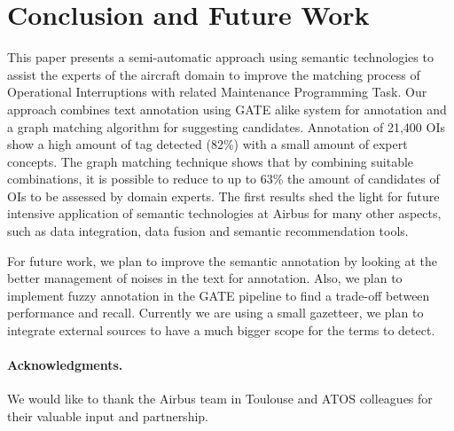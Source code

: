 \documentclass[runningheads,a4paper]{{llncs}}
\begin{document}
\section{Conclusion and Future Work}
\label{sec:conclusion}
This paper presents a semi-automatic approach using semantic technologies to assist the experts of the aircraft domain to improve the matching process of Operational Interruptions with related Maintenance Programming Task. Our approach combines text annotation using GATE alike system for annotation and a graph matching algorithm for suggesting candidates. Annotation of 21,400 OIs show a high amount of tag detected (82\%) with a small amount of expert concepts. The graph matching technique shows that by combining suitable combinations, it is possible to reduce to up to 63\% the amount of candidates of OIs to be assessed by domain experts. The first results shed the light for future intensive application of semantic technologies at Airbus for many other aspects, such as data integration, data fusion and semantic recommendation tools. 

For future work, we plan to improve the semantic annotation by looking at the better management of noises in the text for annotation. Also, we plan to implement fuzzy annotation in the GATE pipeline to find a trade-off between performance and recall. Currently we are using a small gazetteer, we plan to integrate external sources to have a much bigger scope for the terms to detect.  




\paragraph{\textbf{Acknowledgments.}} %
We would like to thank the Airbus team in Toulouse and ATOS colleagues for their valuable input and partnership.



\end{document}
